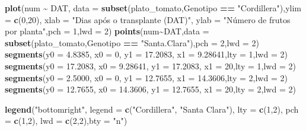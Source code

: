 \documentclass[
]{book}
\newenvironment{Shaded}{\begin{snugshade}}{\end{snugshade}}
\newcommand{\DataTypeTok}[1]{\textcolor[rgb]{0.13,0.29,0.53}{#1}}
\newcommand{\DecValTok}[1]{\textcolor[rgb]{0.00,0.00,0.81}{#1}}
\newcommand{\FloatTok}[1]{\textcolor[rgb]{0.00,0.00,0.81}{#1}}
\newcommand{\KeywordTok}[1]{\textcolor[rgb]{0.13,0.29,0.53}{\textbf{#1}}}
\newcommand{\NormalTok}[1]{#1}
\newcommand{\OperatorTok}[1]{\textcolor[rgb]{0.81,0.36,0.00}{\textbf{#1}}}
\newcommand{\StringTok}[1]{\textcolor[rgb]{0.31,0.60,0.02}{#1}}
\numberwithin{equation}{section}
\begin{document}
\begin{Shaded}
\begin{Highlighting}[]
\KeywordTok{plot}\NormalTok{(num }\OperatorTok{\textasciitilde{}}\StringTok{ }\NormalTok{DAT,}
     \DataTypeTok{data =} \KeywordTok{subset}\NormalTok{(plato\_tomato,Genotipo }\OperatorTok{==}\StringTok{ "Cordillera"}\NormalTok{),}\DataTypeTok{ylim =} \KeywordTok{c}\NormalTok{(}\DecValTok{0}\NormalTok{,}\DecValTok{20}\NormalTok{),}
     \DataTypeTok{xlab =} \StringTok{"Dias após o transplante (DAT)"}\NormalTok{,}
     \DataTypeTok{ylab =} \StringTok{"Número de frutos por planta"}\NormalTok{,}\DataTypeTok{pch =} \DecValTok{1}\NormalTok{,}\DataTypeTok{lwd =} \DecValTok{2}\NormalTok{)}
\KeywordTok{points}\NormalTok{(num}\OperatorTok{\textasciitilde{}}\NormalTok{DAT,}\DataTypeTok{data =} \KeywordTok{subset}\NormalTok{(plato\_tomato,Genotipo }\OperatorTok{==}\StringTok{ "Santa.Clara"}\NormalTok{),}\DataTypeTok{pch =} \DecValTok{2}\NormalTok{,}\DataTypeTok{lwd =} \DecValTok{2}\NormalTok{)}
\KeywordTok{segments}\NormalTok{(}\DataTypeTok{y0 =} \FloatTok{4.8385}\NormalTok{, }\DataTypeTok{x0 =} \DecValTok{0}\NormalTok{, }\DataTypeTok{y1 =} \FloatTok{17.2083}\NormalTok{, }\DataTypeTok{x1 =} \FloatTok{9.28641}\NormalTok{,}\DataTypeTok{lty =} \DecValTok{1}\NormalTok{,}\DataTypeTok{lwd =} \DecValTok{2}\NormalTok{)}
\KeywordTok{segments}\NormalTok{(}\DataTypeTok{y0 =} \FloatTok{17.2083}\NormalTok{, }\DataTypeTok{x0 =} \FloatTok{9.28641}\NormalTok{, }\DataTypeTok{y1 =} \FloatTok{17.2083}\NormalTok{, }\DataTypeTok{x1 =} \DecValTok{20}\NormalTok{,}\DataTypeTok{lty =} \DecValTok{1}\NormalTok{,}\DataTypeTok{lwd =} \DecValTok{2}\NormalTok{)}
\KeywordTok{segments}\NormalTok{(}\DataTypeTok{y0 =} \FloatTok{2.5000}\NormalTok{, }\DataTypeTok{x0 =} \DecValTok{0}\NormalTok{, }\DataTypeTok{y1 =} \FloatTok{12.7655}\NormalTok{, }\DataTypeTok{x1 =} \FloatTok{14.3606}\NormalTok{,}\DataTypeTok{lty =} \DecValTok{2}\NormalTok{,}\DataTypeTok{lwd =} \DecValTok{2}\NormalTok{)}
\KeywordTok{segments}\NormalTok{(}\DataTypeTok{y0 =} \FloatTok{12.7655}\NormalTok{, }\DataTypeTok{x0 =} \FloatTok{14.3606}\NormalTok{, }\DataTypeTok{y1 =} \FloatTok{12.7655}\NormalTok{, }\DataTypeTok{x1 =} \DecValTok{20}\NormalTok{,}\DataTypeTok{lty =} \DecValTok{2}\NormalTok{,}\DataTypeTok{lwd =} \DecValTok{2}\NormalTok{)}


\KeywordTok{legend}\NormalTok{(}\StringTok{"bottomright"}\NormalTok{, }\DataTypeTok{legend =} \KeywordTok{c}\NormalTok{(}\StringTok{"Cordillera"}\NormalTok{, }\StringTok{"Santa Clara"}\NormalTok{), }\DataTypeTok{lty =} \KeywordTok{c}\NormalTok{(}\DecValTok{1}\NormalTok{,}\DecValTok{2}\NormalTok{),}
       \DataTypeTok{pch =} \KeywordTok{c}\NormalTok{(}\DecValTok{1}\NormalTok{,}\DecValTok{2}\NormalTok{), }\DataTypeTok{lwd =} \KeywordTok{c}\NormalTok{(}\DecValTok{2}\NormalTok{,}\DecValTok{2}\NormalTok{),}\DataTypeTok{bty =} \StringTok{"n"}\NormalTok{)}
\end{Highlighting}
\end{Shaded}
\end{document}
